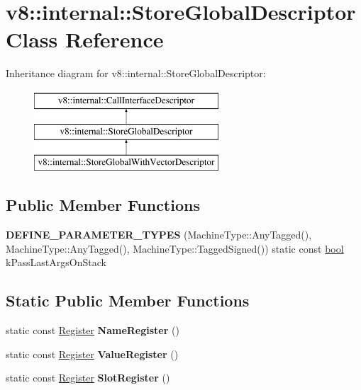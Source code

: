 \hypertarget{classv8_1_1internal_1_1StoreGlobalDescriptor}{}\section{v8\+:\+:internal\+:\+:Store\+Global\+Descriptor Class Reference}
\label{classv8_1_1internal_1_1StoreGlobalDescriptor}
Inheritance diagram for v8\+:\+:internal\+:\+:Store\+Global\+Descriptor\+:\begin{figure}[H]
\begin{center}
\leavevmode
\includegraphics[height=3.000000cm]{classv8_1_1internal_1_1StoreGlobalDescriptor}
\end{center}
\end{figure}
\subsection*{Public Member Functions}
\begin{DoxyCompactItemize}
\item 
\mbox{\label{classv8_1_1internal_1_1StoreGlobalDescriptor_ae83662efd820bc64bdc35ad94f36b801}} 
{\bfseries D\+E\+F\+I\+N\+E\+\_\+\+P\+A\+R\+A\+M\+E\+T\+E\+R\+\_\+\+T\+Y\+P\+ES} (Machine\+Type\+::\+Any\+Tagged(), Machine\+Type\+::\+Any\+Tagged(), Machine\+Type\+::\+Tagged\+Signed()) static const \mbox{\hyperlink{classbool}{bool}} k\+Pass\+Last\+Args\+On\+Stack
\end{DoxyCompactItemize}
\subsection*{Static Public Member Functions}
\begin{DoxyCompactItemize}
\item 
\mbox{\label{classv8_1_1internal_1_1StoreGlobalDescriptor_ad8523e1b17698da33d67659e41f62206}} 
static const \mbox{\hyperlink{classv8_1_1internal_1_1Register}{Register}} {\bfseries Name\+Register} ()
\item 
\mbox{\label{classv8_1_1internal_1_1StoreGlobalDescriptor_ac666d6a93a21b9c48896228841b35d52}} 
static const \mbox{\hyperlink{classv8_1_1internal_1_1Register}{Register}} {\bfseries Value\+Register} ()
\item 
\mbox{\label{classv8_1_1internal_1_1StoreGlobalDescriptor_a773bb77e6a968d37bf759161745f34fb}} 
static const \mbox{\hyperlink{classv8_1_1internal_1_1Register}{Register}} {\bfseries Slot\+Register} ()
\end{DoxyCompactItemize}
